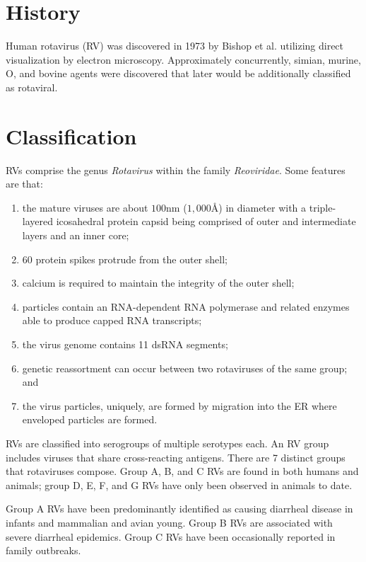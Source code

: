 
\section{History}

Human rotavirus (RV) was discovered in 1973 by Bishop et al. utilizing direct visualization by electron microscopy. Approximately concurrently, simian, murine, O, and bovine agents were discovered that later would be additionally classified as rotaviral.

\section{Classification}

RVs comprise the genus \textit{Rotavirus} within the family \textit{Reoviridae}. Some features are that:

\begin{enumerate}
	\item the mature viruses are about $100$nm ($1,000$\AA) in diameter with a triple-layered icosahedral protein capsid being comprised of outer and intermediate layers and an inner core;
	\item 60 protein spikes protrude from the outer shell;
	\item calcium is required to maintain the integrity of the outer shell;
	\item particles contain an RNA-dependent RNA polymerase and related enzymes able to produce capped RNA transcripts;
	\item the virus genome contains 11 dsRNA segments;
	\item genetic reassortment can occur between two rotaviruses of the same group; and
	\item the virus particles, uniquely, are formed by migration into the ER where enveloped particles are formed.
\end{enumerate}

RVs are classified into serogroups of multiple serotypes each. An RV group includes viruses that share cross-reacting antigens. There are 7 distinct groups that rotaviruses compose. Group A, B, and C RVs are found in both humans and animals; group D, E, F, and G RVs have only been observed in animals to date.

Group A RVs have been predominantly identified as causing diarrheal disease in infants and mammalian and avian young. Group B RVs are associated with severe diarrheal epidemics. Group C RVs have been occasionally reported in family outbreaks.

